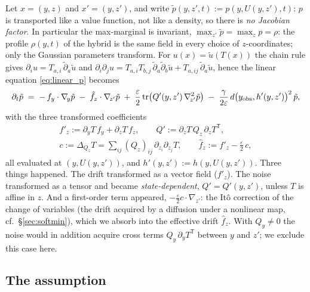 \documentclass[11pt,a4paper]{article}
\newcommand{\tr}{\operatorname{tr}}
\newcommand{\T}{^{\mathsf T}}
\newcommand{\eps}{\varepsilon}
\newcommand{\gy}{\nabla_{\!y}}
\theoremstyle{plain}
\theoremstyle{definition}
\theoremstyle{remark}
\begin{document}
Let $x=(y,z)$ and $x'=(y,z')$, and write $\tilde p(y,z',t) := p(y,U(y,z'),t)$: $p$ is transported like a value function, not like a density, so there is \emph{no Jacobian factor}. In particular the max-marginal is invariant, $\max_{z'}\tilde p = \max_zp = \rho$: the profile $\rho(y,t)$ of the hybrid is the same field in every choice of $z$-coordinates; only the Gaussian parameters transform. For $u(x)=\tilde u(T(x))$ the chain rule gives $\partial_iu = T_{a,i}\,\tilde\partial_a\tilde u$ and $\partial_i\partial_ju = T_{a,i}T_{b,j}\,\tilde\partial_a\tilde\partial_b\tilde u + T_{a,ij}\,\tilde\partial_a\tilde u$, hence the linear equation \eqref{eq:linear_p} becomes
\begin{equation}
  \partial_t\tilde p \;=\; -\,f_y\cdot\gy\tilde p \;-\; \hat f_z\cdot\nabla_{\!z'}\tilde p
  \;+\; \frac\eps2\tr\!\big(Q'(y,z')\,\nabla_{\!z'}^2\tilde p\big) \;-\; \frac{\gamma}{2\eps}\,d\big(y_{\rm obs},h'(y,z')\big)^2\,\tilde p ,
  \label{eq:E_linear}
\end{equation}
with the three transformed coefficients
\begin{equation}
\begin{gathered}
  f'_z := \partial_yT\,f_y + \partial_zT\,f_z, \qquad
  Q' := \partial_zT\,Q_z\,\partial_zT\T, \\
  c := \Delta_{Q_z}T = \sum_{ij}(Q_z)_{ij}\,\partial_{z_i}\partial_{z_j}T ,
  \qquad
  \hat f_z := f'_z - \tfrac\eps2\,c ,
\end{gathered}
  \label{eq:E_coeffs}
\end{equation}
all evaluated at $(y,U(y,z'))$, and $h'(y,z') := h(y,U(y,z'))$. Three things happened. The drift transformed as a vector field ($f'_z$). The noise transformed as a tensor and became \emph{state-dependent}, $Q'=Q'(y,z')$, unless $T$ is affine in $z$. And a first-order term appeared, $-\tfrac\eps2c\cdot\nabla_{z'}$: the It\^o correction of the change of variables (the drift acquired by a diffusion under a nonlinear map, cf.\ \S\ref{sec:softmin}), which we absorb into the effective drift $\hat f_z$. With $Q_y\neq0$ the noise would in addition acquire cross terms $Q_y\,\partial_yT\T$ between $y$ and $z'$; we exclude this case here.

\subsection{The assumption}
\end{document}
